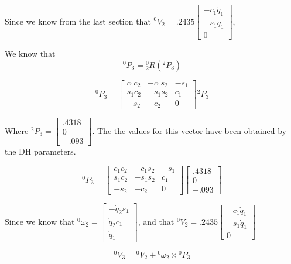 \noindent Since we know from the last section that ${}^{0}V_{2} = .2435 \begin{bmatrix} -c_1\dot{q}_1 \\ -s_1\dot{q}_1 \\ 0\end{bmatrix}$,


\noindent We know that
$$
{}^{0}P_3 = {}^{0}_{2}R \left( {}^{2}P_3\right)
$$


$$
{}^{0}P_3 = \left[\begin{array}{ccc}
c_{1} c_{2} & -c_{1} s_{2} & -s_{1} \\
s_{1} c_{2} & -s_{1} s_{2} & c_{1} \\
-s_{2} & -c_{2} & 0
\end{array}\right] {}^{2}P_3
$$



\noindent Where ${}^{2}P_3 = \begin{bmatrix} .4318 \\ 0 \\ -.093 \end{bmatrix}$. The the values for this vector have been obtained by the DH parameters.



$$
{}^{0}P_3 = \left[\begin{array}{ccc}
c_{1} c_{2} & -c_{1} s_{2} & -s_{1} \\
s_{1} c_{2} & -s_{1} s_{2} & c_{1} \\
-s_{2} & -c_{2} & 0
\end{array}\right] \begin{bmatrix} .4318 \\ 0 \\ -.093 \end{bmatrix}
$$



\noindent Since we know that ${}^{0}\omega_2 = \left[\begin{array}{c} -\dot{q}_{2}s_{1} \\ \dot{q}_{2}c_{1} \\ \dot{q}_{1}\end{array}\right]$, and that ${}^{0}V_{2} = .2435 \begin{bmatrix} -c_1\dot{q}_1 \\ -s_1\dot{q}_1 \\ 0 \end{bmatrix}$

$$
{}^{0}V_{3} = {}^{0}V_2 + {}^{0}\omega_2 \times {}^{0}P_{3}
$$



